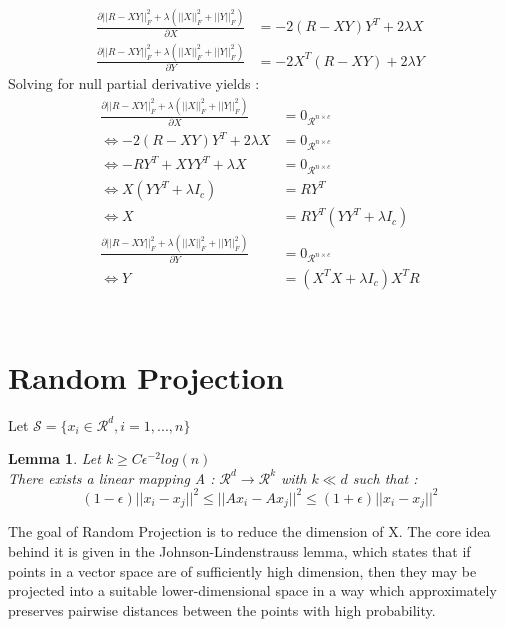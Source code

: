 \documentclass{article}
\newtheorem{lemma}[theorem]{Lemma}
\begin{document}
\begin{align*}
    \frac{\partial ||R-XY||_F^2 + \lambda (||X||_F^2 + ||Y||_F^2)}{\partial X} &= -2(R-XY)Y^T + 2\lambda X\\
    \frac{\partial ||R-XY||_F^2 + \lambda (||X||_F^2 + ||Y||_F^2)}{\partial Y} &= -2X^T(R-XY) + 2\lambda Y
\end{align*}
Solving for null partial derivative yields :
\begin{align*}
    \frac{\partial ||R-XY||_F^2 + \lambda (||X||_F^2 + ||Y||_F^2)}{\partial X} &= 0_{\mathcal{R}^{n \times c}} \\
    \Longleftrightarrow -2(R-XY)Y^T + 2\lambda X &= 0_{\mathcal{R}^{n \times c}}\\
    \Longleftrightarrow -RY^T +XYY^T + \lambda X &= 0_{\mathcal{R}^{n \times c}} \\
    \Longleftrightarrow X(YY^T + \lambda I_{c}) &= RY^T \\
    \Longleftrightarrow X &= RY^T (YY^T + \lambda I_{c}) \\
    \frac{\partial ||R-XY||_F^2 + \lambda (||X||_F^2 + ||Y||_F^2)}{\partial Y} &= 0_{\mathcal{R}^{n \times c}}\\
    \Longleftrightarrow Y &= (X^TX + \lambda I_{c}) X^TR\\
\end{align*}\\

\section{Random Projection}
Let $\mathcal{S} = \{x_i \in \mathcal{R}^d, i=1,...,n\}$
\begin{lemma}
    Let $k \geq C \epsilon^{-2} log(n)$ \\
    There exists a linear mapping A : $\mathcal{R}^d \longrightarrow \mathcal{R}^k$ with $k \ll d$ such that : 
    \begin{equation*}
        (1-\epsilon) ||x_i-x_j||^2 \leq ||Ax_i - Ax_j||^2 \leq (1+\epsilon)||x_i-x_j||^2
    \end{equation*}
\end{lemma}

The goal of Random Projection is to reduce the dimension of X. The core idea behind it is given in the Johnson-Lindenstrauss lemma, which states that if points in a vector space are of sufficiently high dimension, then they may be projected into a suitable lower-dimensional space in a way which approximately preserves pairwise distances between the points with high probability. \\
\end{document}
